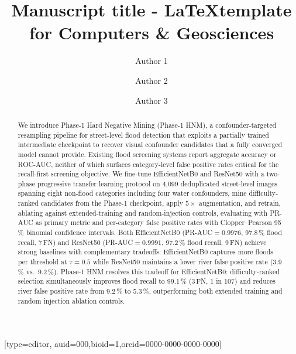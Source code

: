 \documentclass[a4paper,fleqn]{cas-sc}
\newcommand{\EffNet}{EfficientNetB0\xspace}
\newcommand{\ResNet}{ResNet50\xspace}
\newcommand{\PHNM}{Phase-1 HNM\xspace}
\newcommand{\PR}{PR-AUC\xspace}
\newcommand{\CP}{Clopper--Pearson\xspace}
\begin{document}
\let\WriteBookmarks\relax
\def\floatpagepagefraction{1}
\def\textpagefraction{.001}

\title [mode = title]{Manuscript title - \LaTeX  template for Computers \& Geosciences  }


\author[1]{Author 1}[type=editor,
                        auid=000,bioid=1,orcid=0000-0000-0000-0000]

\author[2]{Author 2} 

\author[3]{Author 3}

\address[1]{Author 1 affiliation}
\address[2]{Author 2 affiliation}
\address[3]{Author 3 affiliation} 

\begin{abstract}
We introduce Phase-1 Hard Negative Mining (\PHNM{}), a confounder-targeted
resampling pipeline for street-level flood detection that exploits a partially
trained intermediate checkpoint to recover visual confounder candidates that a
fully converged model cannot provide.
Existing flood screening systems report aggregate accuracy or ROC-AUC, neither of which
surfaces category-level false positive rates critical for the recall-first screening objective.
We fine-tune \EffNet{} and \ResNet{} with a two-phase progressive transfer
learning protocol on 4,099 deduplicated street-level images spanning eight
non-flood categories including four water confounders, mine difficulty-ranked
candidates from the Phase-1 checkpoint, apply $5\times$ augmentation, and
retrain, ablating against extended-training and random-injection controls,
evaluating with \PR{} as primary metric and per-category false positive rates
with \CP{} 95\,\% binomial confidence intervals.
Both \EffNet{} (\PR{}$= 0.9976$, 97.8\,\% flood recall, 7\,FN) and \ResNet{}
(\PR{}$= 0.9991$, 97.2\,\% flood recall, 9\,FN) achieve strong baselines with
complementary tradeoffs: \EffNet{} captures more floods per threshold at
$\tau{=}0.5$ while \ResNet{} maintains a lower river false positive rate
(3.9\,\% vs.\ 9.2\,\%).
\PHNM{} resolves this tradeoff for \EffNet{}: difficulty-ranked selection
simultaneously improves flood recall to 99.1\,\% (3\,FN, 1 in 107) and reduces
river false positive rate from 9.2\,\% to 5.3\,\%, outperforming both extended
training and random injection ablation controls.
\end{abstract}
 
\end{document}
